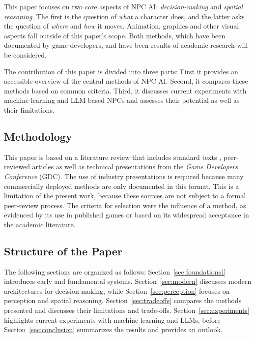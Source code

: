 This paper focuses on two core aspects of NPC AI: \emph{decision-making} and \emph{spatial reasoning}. The first is the question of \emph{what} a character does, and the latter asks the question of \emph{where} and \emph{how} it moves. Animation, graphics and other visual aspects fall outside of this paper's scope. Both methods, which have been documented by game developers, and have been results of academic research will be considered.

The contribution of this paper is divided into three parts: First it provides an accessible overview of the central methods of NPC AI. Second, it compares these methods based on common criteria. Third, it discusses current experiments with machine learning and LLM-based NPCs and assesses their potential as well as their limitations. 

\subsection{Methodology}

This paper is based on a literature review that includes standard texts \cite{millington2009,yannakakis2018}, peer-reviewed articles as well as technical presentations from the \emph{Game Developers Conference} (GDC). The use of industry presentations is required because many commercially deployed methods are only documented in this format. This is a limitation of the present work, because these sources are not subject to a formal peer-review process. The criteria for selection were the influence of a method, as evidenced by its use in published games or based on its widespread acceptance in the academic literature.

\subsection{Structure of the Paper}
The following sections are organized as follows: Section~\ref{sec:foundational} introduces early and fundamental systems. Section~\ref{sec:modern} discusses modern architectures for decision-making, while Section~\ref{sec:perception} focuses on perception and spatial reasoning. Section~\ref{sec:tradeoffs} compares the methods presented and discusses their limitations and trade-offs. Section~\ref{sec:experiments} highlights current experiments with machine learning and LLMs, before Section~\ref{sec:conclusion} summarizes the results and provides an outlook.




